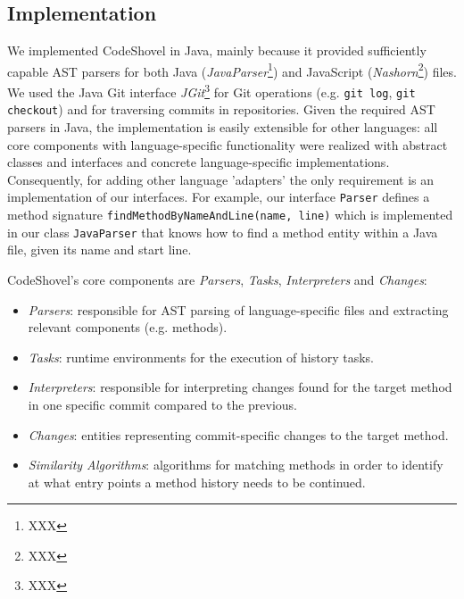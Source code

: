 \subsection{Implementation}
\label{sec:implementation}

We implemented CodeShovel in Java, mainly because it provided sufficiently capable AST parsers for both Java (\textit{JavaParser}\footnote{XXX}) and JavaScript (\textit{Nashorn}\footnote{XXX}) files. We used the Java Git interface \textit{JGit}\footnote{XXX} for Git operations (e.g. \texttt{git log}, \texttt{git checkout}) and for traversing commits in repositories. Given the required AST parsers in Java, the implementation is easily extensible for other languages: all core components with language-specific functionality were realized with abstract classes and interfaces and concrete language-specific implementations. Consequently, for adding other language 'adapters' the only requirement is an implementation of our interfaces. For example, our interface \texttt{Parser} defines a method signature \texttt{findMethodByNameAndLine(name, line)} which is implemented in our class \texttt{JavaParser} that knows how to find a method entity within a Java file, given its name and start line.

CodeShovel's core components are \textit{Parsers}, \textit{Tasks}, \textit{Interpreters} and \textit{Changes}:
\begin{itemize}
	\item \textit{Parsers}: responsible for AST parsing of language-specific files and extracting relevant components (e.g. methods).
	\item \textit{Tasks}: runtime environments for the execution of history tasks.
	\item \textit{Interpreters}: responsible for interpreting changes found for the target method in one specific commit compared to the previous.
	\item \textit{Changes}: entities representing commit-specific changes to the target method.
	\item \textit{Similarity Algorithms}: algorithms for matching methods in order to identify at what entry points a method history needs to be continued.
\end{itemize}

